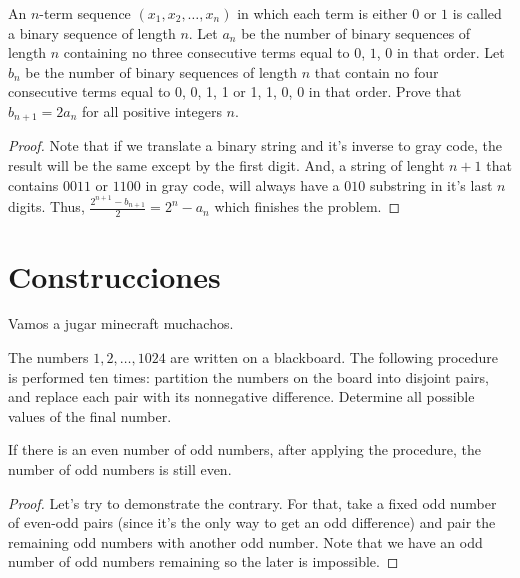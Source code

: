 \begin{problem}
  An $n$-term sequence $(x_1, x_2, \dots, x_n)$
  in which each term is either $0$ or $1$ is called a binary sequence of length $n$.
  Let $a_n$ be the number of binary sequences of length $n$ containing
  no three consecutive terms equal to $0$, $1$, $0$ in that order.
  Let $b_n$ be the number of binary sequences of length $n$ that
  contain no four consecutive terms equal to 0, 0, 1, 1 or 1, 1, 0, 0 in that order.
  Prove that $b_{n+1} = 2a_n$ for all positive integers $n$.
\end{problem}

\begin{proof}
  Note that if we translate a binary string and it's inverse 
  to gray code, the result will be the same except by the first 
  digit. And, a string of lenght $n+1$ that contains $0011$ or 
  $1100$ in gray code, will always have a $010$ substring in 
  it's last $n$ digits. Thus, $\frac{2^{n+1}-b_{n+1}}{2} = 2^{n}-a_n$ 
  which finishes the problem.
\end{proof} 

\section{Construcciones}

Vamos a jugar minecraft muchachos.

\begin{problem}
  The numbers $1, 2, \dots, 1024$ are written on a blackboard.
  The following procedure is performed ten times:
  partition the numbers on the board into disjoint pairs,
  and replace each pair with its nonnegative difference.
  Determine all possible values of the final number.
\end{problem}

\begin{claim}
  If there is an even number of odd numbers, 
  after applying the procedure, the number of odd numbers is 
  still even. 
\end{claim}

\begin{proof}
  Let's try to demonstrate the contrary. For that, 
  take a fixed odd number of even-odd pairs (since it's the only 
  way to get an odd difference) and pair the remaining 
  odd numbers with another odd number. Note that we have an 
  odd number of odd numbers remaining so the later is impossible.
\end{proof}

